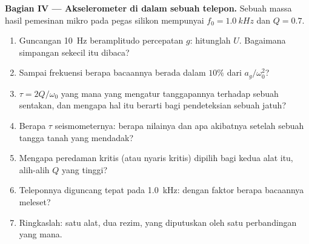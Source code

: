 \begin{problem}
\medskip
\noindent\textbf{Bagian IV --- Akselerometer di dalam sebuah telepon.}
Sebuah massa hasil pemesinan mikro pada pegas silikon mempunyai
$f_0 = \qty{1.0}{kHz}$ dan $Q = 0.7$.
\begin{enumerate}[resume]
  \item Guncangan \qty{10}{Hz} beramplitudo percepatan $g$: hitunglah
        $U$. Bagaimana simpangan sekecil itu dibaca?
  \item Sampai frekuensi berapa bacaannya berada dalam $10\%$ dari
        $a_g/\omega_0^2$?
  \item {} $\tau = 2Q/\omega_0$ yang mana yang mengatur
        tanggapannya terhadap sebuah sentakan, dan mengapa hal itu
        berarti bagi pendeteksian sebuah jatuh?
  \item Berapa $\tau$ seismometernya: berapa nilainya dan apa akibatnya
        setelah sebuah tangga tanah yang mendadak?
  \item Mengapa peredaman kritis (atau nyaris kritis) dipilih bagi kedua
        alat itu, alih-alih $Q$ yang tinggi?
  \item Teleponnya diguncang tepat pada \qty{1.0}{kHz}: dengan faktor
        berapa bacaannya meleset?
  \item Ringkaslah: satu alat, dua rezim, yang diputuskan oleh satu
        perbandingan yang mana.
\end{enumerate}
\end{problem}
